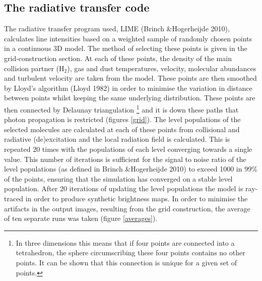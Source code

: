 \documentclass[useAMS,usenatbib]{mn2e}
\begin{document}
\subsection{The radiative transfer code} \label{subsec:radiative_transfer_code}
The radiative transfer program used, LIME (Brinch \&Hogerheijde 2010), calculates line intensities based on a weighted sample of randomly chosen points in a continuous 3D model. The method of selecting these points is given in the grid-construction section. At each of these points, the density of the main collision partner (H$_2$), gas and dust temperatures, velocity, molecular abundances and turbulent velocity are taken from the model. These points are then smoothed by Lloyd's algorithm (Lloyd 1982) in order to minimise the variation in distance between points whilst keeping the same underlying distribution. These points are then connected by Delaunay triangulation \footnote{In three dimensions this means that if four points are connected into a tetrahedron, the sphere circumscribing these four points contains no other points. It can be shown that this connection is unique for a given set of points.} and it is down these paths that photon propagation is restricted (figures \ref{grid}). The level populations of the selected molecules are calculated at each of these points from collisional and radiative (de)excitation and the local radiation field is calculated. This is repeated 20 times with the populations of each level converging towards a single value. This number of iterations is sufficient for the signal to noise ratio of the level populations (as defined in Brinch \&Hogerheijde 2010) to exceed 1000 in 99\% of the points, ensuring that the simulation has converged on a stable level population. \newline
After 20 iterations of updating the level populations the model is ray-traced in order to produce synthetic brightness maps. In order to minimise the artifacts in the output images, resulting from the grid construction, the average of ten separate runs was taken (figure \ref{averages}).


\end{document}
